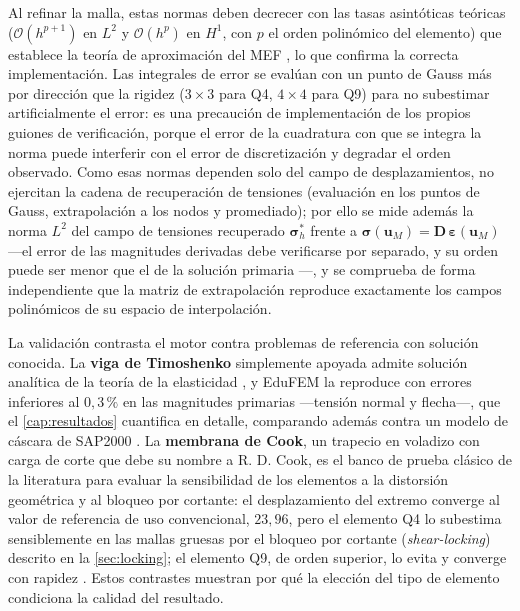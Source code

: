 Al refinar la malla, estas normas deben decrecer con las tasas asintóticas teóricas ($\mathcal{O}(h^{p+1})$ en $L^2$ y $\mathcal{O}(h^p)$ en $H^1$, con $p$ el orden polinómico del elemento) que establece la teoría de aproximación del MEF \autocites[pp.~106-107]{strang2008analysis}[pp.~189-190]{hughes2000fem}, lo que confirma la correcta implementación. Las integrales de error se evalúan con un punto de Gauss más por dirección que la rigidez ($3\times3$ para Q4, $4\times4$ para Q9) para no subestimar artificialmente el error: es una precaución de implementación de los propios guiones de verificación, porque el error de la cuadratura con que se integra la norma puede interferir con el error de discretización y degradar el orden observado. Como esas normas dependen solo del campo de desplazamientos, no ejercitan la cadena de recuperación de tensiones (evaluación en los puntos de Gauss, extrapolación a los nodos y promediado); por ello se mide además la norma $L^2$ del campo de tensiones recuperado $\bm{\sigma}^*_h$ frente a $\bm{\sigma}(\bm{u}_M)=\bm{D}\,\bm{\varepsilon}(\bm{u}_M)$ —el error de las magnitudes derivadas debe verificarse por separado, y su orden puede ser menor que el de la solución primaria \autocite[p.~29]{salari2000mms}—, y se comprueba de forma independiente que la matriz de extrapolación reproduce exactamente los campos polinómicos de su espacio de interpolación.

La validación contrasta el motor contra problemas de referencia con solución conocida. La \textbf{viga de Timoshenko} simplemente apoyada admite solución analítica de la teoría de la elasticidad \autocite[art.~21, pp.~39-43]{timoshenko1970elasticity}, y EduFEM la reproduce con errores inferiores al $0{,}3\,\%$ en las magnitudes primarias —tensión normal y flecha—, que el \autoref{cap:resultados} cuantifica en detalle, comparando además contra un modelo de cáscara de SAP2000 \autocite{csi2017sap2000}. La \textbf{membrana de Cook}, un trapecio en voladizo con carga de corte que debe su nombre a R. D. Cook, es el banco de prueba clásico de la literatura para evaluar la sensibilidad de los elementos a la distorsión geométrica y al bloqueo por cortante: el desplazamiento del extremo converge al valor de referencia de uso convencional, $23{,}96$, pero el elemento Q4 lo subestima sensiblemente en las mallas gruesas por el bloqueo por cortante (\emph{shear-locking}) descrito en la \autoref{sec:locking}; el elemento Q9, de orden superior, lo evita y converge con rapidez \autocites[p.~98]{cook2002concepts}[p.~221]{hughes2000fem}. Estos contrastes muestran por qué la elección del tipo de elemento condiciona la calidad del resultado.
